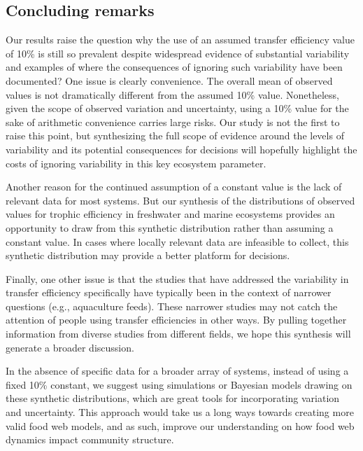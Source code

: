 \documentclass[oneside,12pt,final]{sty/ucthesis-CA2012}
\begin{document}
\begin{mainmatter}
\section*{Concluding remarks}
Our results raise the question why the use of an assumed transfer efficiency value of 10\% is still so prevalent despite widespread evidence of substantial variability and examples of where the consequences of ignoring such variability have been documented? One issue is clearly convenience. The overall mean of observed values is not dramatically different from the assumed 10\% value. Nonetheless, given the scope of observed variation and uncertainty, using a 10\% value for the sake of arithmetic convenience carries large risks. Our study is not the first to raise this point, but synthesizing the full scope of evidence around the levels of variability and its potential consequences for decisions will hopefully highlight the costs of ignoring variability in this key ecosystem parameter. 

\vspace{5mm}

Another reason for the continued assumption of a constant value is the lack of relevant data for most systems. But our synthesis of the distributions of observed values for trophic efficiency in freshwater and marine ecosystems provides an opportunity to draw from this synthetic distribution rather than assuming a constant value. In cases where locally relevant data are infeasible to collect, this synthetic distribution may provide a better platform for decisions. 

\vspace{5mm}

Finally, one other issue is that the studies that have addressed the variability in transfer efficiency specifically have typically been in the context of narrower questions (e.g., aquaculture feeds). These narrower studies may not catch the attention of people using transfer efficiencies in other ways. By pulling together information from diverse studies from different fields, we hope this synthesis will generate a broader discussion.

\vspace{5mm}

In the absence of specific data for a broader array of systems, instead of using a fixed 10\% constant, we suggest using simulations or Bayesian models drawing on these synthetic distributions, which are great tools for incorporating variation and uncertainty. This approach would take us a long ways towards creating more valid food web models, and as such, improve our understanding on how food web dynamics impact community structure. 





\end{mainmatter}
\end{document}
